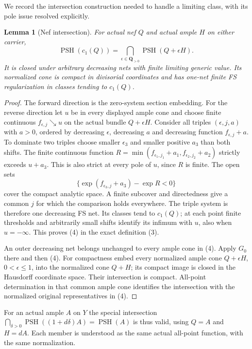 \documentclass[11pt]{article}
\newcommand{\PSH}{\operatorname{PSH}}
\newtheorem{lemma}[theorem]{Lemma}
\begin{document}
We record the intersection construction needed to handle a limiting
class, with its pole issue resolved explicitly.
\begin{lemma}[Nef intersection]
For actual nef $Q$ and actual ample $H$ on either carrier,
\[
 \PSH(c_1(Q))=\bigcap_{\epsilon\in\mathbf Q_{>0}}
                         \PSH(Q+\epsilon H).             \tag{4}
\]
It is closed under arbitrary decreasing nets with finite limiting
generic value. Its normalized cone is compact in divisorial
coordinates and has one-net finite FS regularization in classes
tending to $c_1(Q)$.
\end{lemma}
\begin{proof}
The forward direction is the zero-system section embedding.
For the reverse direction let $u$ be in every displayed ample cone
and choose finite continuous $f_{\epsilon,j}\searrow u$ on
the actual bundle $Q+\epsilon H$. Consider all triples
$(\epsilon,j,a)$ with $a>0$, ordered by decreasing $\epsilon$,
decreasing $a$ and decreasing function $f_{\epsilon,j}+a$.
To dominate two triples choose smaller $\epsilon_3$ and smaller
positive $a_3$ than both shifts. The finite continuous function
$R=\min(f_{\epsilon_1,j_1}+a_1,f_{\epsilon_2,j_2}+a_2)$
strictly exceeds $u+a_3$. This is also strict at every pole of $u$,
since $R$ is finite. The open sets
\[
 \{\exp(f_{\epsilon_3,j}+a_3)-\exp R<0\}
\]
cover the compact analytic space. A finite subcover and directedness
give a common $j$ for which the comparison holds everywhere.
The triple system is therefore one decreasing FS net. Its classes
tend to $c_1(Q)$; at each point finite thresholds and arbitrarily
small shifts identify its infimum with $u$, also when $u=-\infty$.
This proves (4) in the exact definition (3).

An outer decreasing net belongs unchanged to every ample cone in
(4). Apply $G_0$ there and then (4). For compactness embed every
normalized ample cone $Q+\epsilon H$, $0<\epsilon\leq1$, into
the normalized cone $Q+H$; its compact image is closed in the
Hausdorff coordinate space. Their intersection is compact. All-point
determination in that common ample cone identifies the intersection
with the normalized original representatives in (4).
\end{proof}

For an actual ample $A$ on $Y$ the special intersection
$\bigcap_{\delta>0}\PSH((1+d\delta)A)=\PSH(A)$
is thus valid, using $Q=A$ and $H=dA$. Each member is understood
as the same actual all-point function, with the same normalization.
\end{document}
